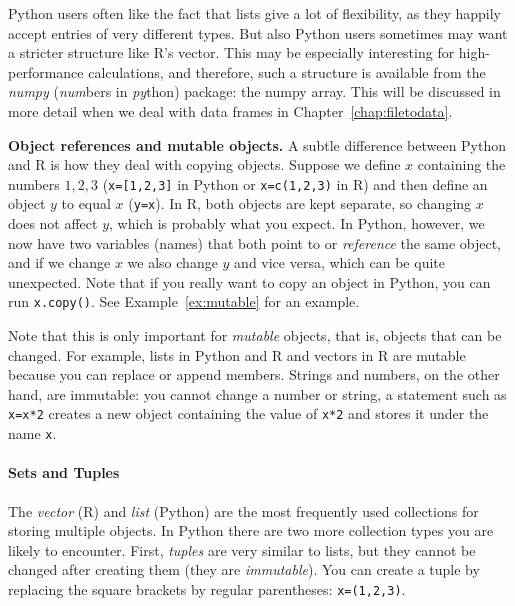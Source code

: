 
Python users often like the fact that lists give  a lot of flexibility, as they happily accept
entries of very different types. But also Python users sometimes may want a stricter
structure like R's vector. This may be especially interesting for
high-performance calculations, and therefore, such a structure is
available from the \emph{numpy} (\emph{num}bers in \emph{py}thon)
package: the numpy array.
This will be discussed in more detail when we deal with data frames in Chapter~\ref{chap:filetodata}.


\begin{feature}\textbf{Object references and mutable objects.}
  A subtle difference between Python and R is how they deal with copying objects.
  Suppose we define $x$ containing the numbers $1,2,3$ (\verb|x=[1,2,3]| in Python or \verb|x=c(1,2,3)| in R)
  and then define an object $y$ to equal $x$ (\verb|y=x|).
  In R, both objects are kept separate, so changing $x$ does not affect $y$,
  which is probably what you expect.
  In Python, however, we now have two variables (names) that both point to or \emph{reference} the same object,
  and if we change $x$ we also change $y$ and vice versa, which can be quite unexpected.
  Note that if you really want to copy an object in Python, you can run \verb|x.copy()|.
  See Example~\ref{ex:mutable} for an example.

  Note that this is only important for \emph{mutable} objects, that is,
  objects that can be changed.
  For example, lists in Python and R and vectors in R are mutable because you can replace or append members.
  Strings and numbers, on the other hand, are immutable:
  you cannot change a number or string, a statement such as \verb|x=x*2| creates a new object containing the value of \verb|x*2| and stores it under the name \verb|x|.

\end{feature}
  

\paragraph{Sets and Tuples}
The \emph{vector} (R) and \emph{list} (Python) are the most frequently used collections
for storing multiple objects. 
In Python there are two more collection types you are likely to encounter.
First, \emph{tuples} are very similar to lists, but they cannot be changed after creating them
(they are \emph{immutable}).
You can create a tuple by replacing the square brackets by regular parentheses:
\verb|x=(1,2,3)|. 

